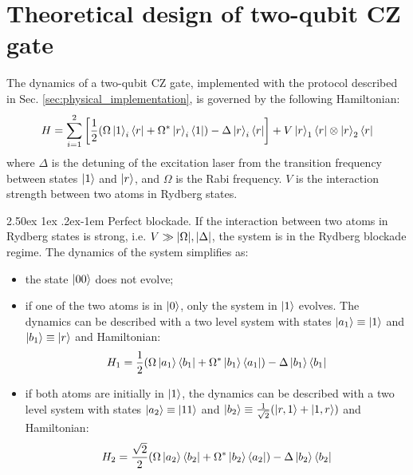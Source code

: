 \documentclass[rmp,10pt,onecolumn,fleqn,notitlepage]{revtex4-1}
\makeatletter
\renewcommand{\paragraph}{%
    \@startsection{paragraph}{4}%
    {\z@}{2.50ex \@plus 1ex \@minus .2ex}{-1em}%
    {\bf\sffamily}%
}
\makeatother
\begin{document}
\section{Theoretical design of two-qubit CZ gate}  
\label{sec:theoretical_design_CZ}
The dynamics of a two-qubit CZ gate, implemented with the protocol described in Sec. \ref{sec:physical_implementation}, is governed by the following Hamiltonian:
\begin{equation}
    H = \sum_{i=1}^{2}  \qty[ \frac{1}{2} \qty( \Omega \left\vert{1}\right\rangle_i \left\langle{r}\right\vert +
    \Omega^* \left\vert{r}\right\rangle_i \left\langle{1}\right\vert ) -
    \Delta \left\vert{r}\right\rangle_i \left\langle{r}\right\vert ] +
    V \left\vert{r}\right\rangle_1 \left\langle{r}\right\vert \otimes \left\vert{r}\right\rangle_2 \left\langle{r}\right\vert
\end{equation}
where $\Delta$ is the detuning of the excitation laser from the transition frequency between states $\left\vert{1}\right\rangle$ and $\left\vert{r}\right\rangle$, and $\Omega$ is the Rabi frequency. $V$ is the interaction strength between two atoms in Rydberg states. 

\paragraph{Perfect blockade.} If the interaction between two atoms in Rydberg states is strong, i.e. $V \gg \abs{\Omega}, \abs{\Delta}$, the system is in the Rydberg blockade regime. The dynamics of the system simplifies as:
\begin{itemize}
    \item the state $\left\vert{00}\right\rangle$ does not evolve;
    
    \item if one of the two atoms is in $\left\vert{0}\right\rangle$, only the system in $\left\vert{1}\right\rangle$ evolves. The dynamics can be described with a two level system with states $\left\vert{a_1}\right\rangle\equiv\left\vert{1}\right\rangle$ and $\left\vert{b_1}\right\rangle\equiv\left\vert{r}\right\rangle$ and Hamiltonian:
    \begin{equation}
        H_1 = \frac{1}{2} \qty( \Omega \left\vert{a_1}\right\rangle\left\langle{b_1}\right\vert + 
        \Omega^* \left\vert{b_1}\right\rangle\left\langle{a_1}\right\vert)
        - \Delta \left\vert{b_1}\right\rangle\left\langle{b_1}\right\vert
        \label{eq:perfect-H_1}
    \end{equation}
    
    \item if both atoms are initially in $\left\vert{1}\right\rangle$, the dynamics can be described with a two level system with states $\left\vert{a_2}\right\rangle\equiv\left\vert{11}\right\rangle$ and $\left\vert{b_2}\right\rangle\equiv \frac{1}{\sqrt{2}} \qty( \left\vert{r,1}\right\rangle + \left\vert{1,r}\right\rangle )$ and Hamiltonian:
    \begin{equation}
        H_2 = \frac{\sqrt{2}}{2} \qty( \Omega \left\vert{a_2}\right\rangle\left\langle{b_2}\right\vert + 
        \Omega^* \left\vert{b_2}\right\rangle\left\langle{a_2}\right\vert)
        - \Delta \left\vert{b_2}\right\rangle\left\langle{b_2}\right\vert
        \label{eq:perfect-H_2}
    \end{equation}
    
\end{itemize}
\end{document}
